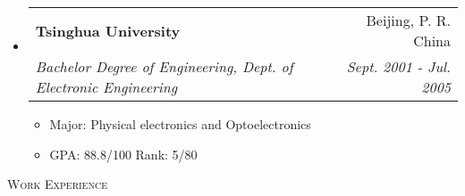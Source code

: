 \documentclass[letterpaper,11pt]{article}
\makeatletter
\newcommand{\resheading}[1]{{\noindent\large \colorbox{mygrey}{
\begin{minipage}{1.0\textwidth}{\textsc{#1 \vphantom{p\^{E}}}}\end{minipage}}}}
\newcommand{\ressubheading}[4]{
\begin{tabular*}{6.69in}{l@{\extracolsep{\fill}}r}
        \textbf{#1} & #2 \\
        \textit{#3} & \textit{#4} \\
\end{tabular*}\vspace{-6pt}
}
\newcommand{\resitem}[1]{\item #1 \vspace{-2pt}}
\makeatother
\begin{document}
\begin{CJK}{UTF8}{gbsn}
\begin{itemize}
\item
    \ressubheading{Tsinghua University}{Beijing, P. R. China}
    {Bachelor Degree of Engineering, Dept. of Electronic Engineering}{Sept. 2001 - Jul. 2005}%
    \begin{itemize}
        \resitem{Major: Physical electronics and Optoelectronics}
        \resitem{GPA: 88.8/100 Rank: 5/80}
    \end{itemize}

\end{itemize}




\resheading{Work Experience}%
\begin{itemize}
\setlength{\itemindent}{-0.075in}


\end{itemize}
\end{CJK}
\end{document}
